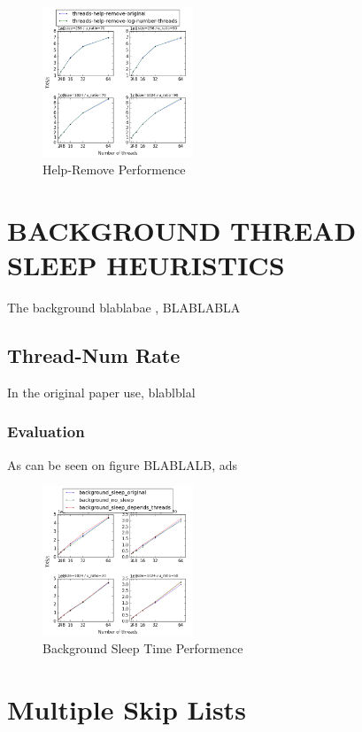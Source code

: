 \documentclass{article}
\begin{document}
\begin{figure}
	\caption{Help-Remove Performence}
	\centering
	\includegraphics[width=0.4\textwidth]{help-remove_plot}
\end{figure}

\section{BACKGROUND THREAD SLEEP HEURISTICS}
\label{sec:bts}

The background blablabae , BLABLABLA

\subsection{Thread-Num Rate}
\label{ssec:dsrs}

In the original paper use, blablblal

\subsubsection{Evaluation}
\label{sssec:dsrs-evl}

As can be seen on figure BLABLALB, ads

\begin{figure}
	\caption{Background Sleep Time Performence}
	\centering
	\includegraphics[width=0.4\textwidth]{sleep_plot}
\end{figure}


\section{Multiple Skip Lists}
\label{sec:msl}
\end{document}
